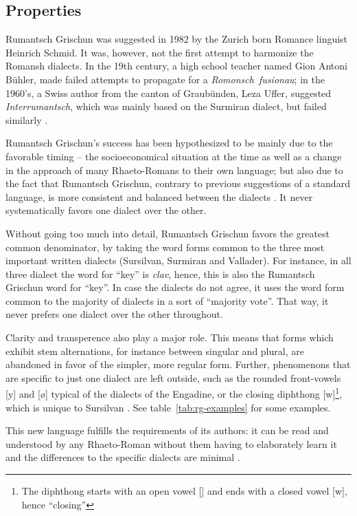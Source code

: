 \subsection{Properties}
Rumantsch Grischun was suggested in 1982 by the Zurich born Romance linguist Heinrich Schmid. 
It was, however, not the first attempt to harmonize the Romansh dialects. 
In the 19th century, a high school teacher named Gion Antoni Bühler, made failed attempts to propagate for a \mbox{\emph{Romonsch fusionau}}; in the 1960's, a Swiss author from the canton of Graubünden, Leza Uffer, suggested \emph{Interrumantsch}, which was mainly based on the Surmiran dialect, but failed similarly \autocite[39]{liver1999}.

Rumantsch Grischun's success has been hypothesized to be mainly due to the favorable timing -- the socioeconomical situation at the time as well as a change in the approach of many Rhaeto-Romans to their own language; but also due to the fact that Rumantsch Grischun, contrary to previous suggestions of a standard language, is more consistent and balanced between the dialects \autocite[69]{liver1999}. 
It never systematically favors one dialect over the other.

Without going too much into detail, Rumantsch Grischun favors the greatest common denominator, by  taking the word forms common to the three most important written dialects (Sursilvan, Surmiran and Vallader). For instance, in all three dialect the word for \enquote{key} is \emph{clav}, hence, this is also the Rumantsch Grischun word for \enquote{key}.
In case the dialects do not agree, it uses the word form common to the majority of dialects in a sort of \enquote{majority vote}. 
That way, it never prefers one dialect over the other throughout. 

Clarity and transperence also play a major role. 
This means that forms which exhibit stem alternations, for instance between singular and plural, are abandoned in favor of the simpler, more regular form.
Further, phenomenons that are specific to just one dialect are left outside, such as the rounded front-vowels [y] and [ø] typical of the dialects of the Engadine, or the closing diphthong [\textsci w]\footnote{The diphthong starts with an open vowel [\textsci] and ends with a closed vowel [w], hence \enquote{closing}}, which is unique to Sursilvan \autocite[70]{liver1999}. 
See table~\ref{tab:rg-examples} for some examples.

This new language fulfills the requirements of its authors: it can be read and understood by any Rhaeto-Roman without them having to elaborately learn it and the differences to the specific dialects are minimal \autocite[72]{liver1999}. 


